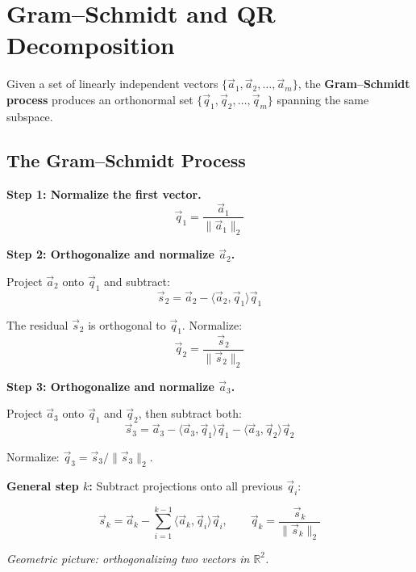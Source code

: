 \documentclass[10pt, twocolumn]{article}
\theoremstyle{definition}
\theoremstyle{plain}
\newcommand{\RR}{\mathbb{R}}
\begin{document}
\section{Gram--Schmidt and QR Decomposition}

Given a set of linearly independent vectors $\{\vec{a}_1, \vec{a}_2, \ldots, \vec{a}_m\}$, the \textbf{Gram--Schmidt process} produces an orthonormal set $\{\vec{q}_1, \vec{q}_2, \ldots, \vec{q}_m\}$ spanning the same subspace.

\subsection{The Gram--Schmidt Process}

\textbf{Step 1: Normalize the first vector.}
\[
    \vec{q}_1 = \frac{\vec{a}_1}{\|\vec{a}_1\|_2}
\]

\textbf{Step 2: Orthogonalize and normalize $\vec{a}_2$.}

Project $\vec{a}_2$ onto $\vec{q}_1$ and subtract:
\[
    \vec{s}_2 = \vec{a}_2 - \langle \vec{a}_2, \vec{q}_1 \rangle \vec{q}_1
\]

The residual $\vec{s}_2$ is orthogonal to $\vec{q}_1$. Normalize:
\[
    \vec{q}_2 = \frac{\vec{s}_2}{\|\vec{s}_2\|_2}
\]

\textbf{Step 3: Orthogonalize and normalize $\vec{a}_3$.}

Project $\vec{a}_3$ onto $\vec{q}_1$ and $\vec{q}_2$, then subtract both:
\[
    \vec{s}_3 = \vec{a}_3 - \langle \vec{a}_3, \vec{q}_1 \rangle \vec{q}_1 - \langle \vec{a}_3, \vec{q}_2 \rangle \vec{q}_2
\]

Normalize: $\vec{q}_3 = \vec{s}_3 / \|\vec{s}_3\|_2$.

\textbf{General step $k$:} Subtract projections onto all previous $\vec{q}_i$:
\begin{result}
\[
    \vec{s}_k = \vec{a}_k - \sum_{i=1}^{k-1} \langle \vec{a}_k, \vec{q}_i \rangle \vec{q}_i, \qquad \vec{q}_k = \frac{\vec{s}_k}{\|\vec{s}_k\|_2}
\]
\end{result}

\textit{Geometric picture: orthogonalizing two vectors in $\RR^2$.}
\end{document}

